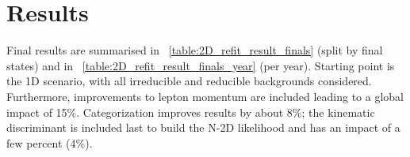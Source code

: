 \section{Results}
\label{sec:results}
Final results are summarised in \tablename~\ref{table:2D_refit_result_finals} (split by final states) and in \tablename~\ref{table:2D_refit_result_finals_year} (per year).
Starting point is the 1D scenario, with all irreducible and reducible backgrounds considered.
Furthermore, improvements to lepton momentum are included leading to a global impact of 15\%.
Categorization improves results by about 8\%;
the kinematic discriminant is included last to build the N-2D likelihood and has an impact of a few percent (4\%).
%

